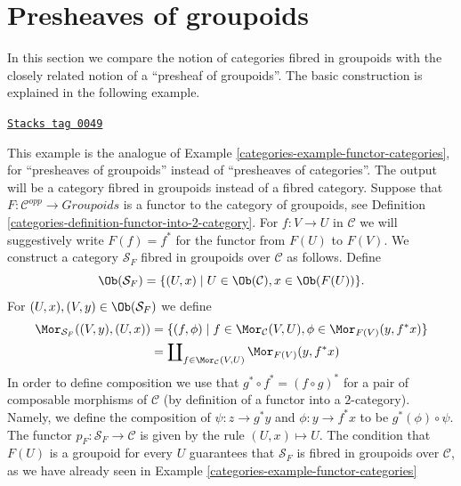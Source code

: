 \section{Presheaves of groupoids}
\label{categories-section-presheaves-groupoids}
In this section we compare the notion of categories fibred in groupoids
with the closely related notion of a ``presheaf of groupoids''. The basic
construction is explained in the following example.

\begin{example}
\label{categories-example-functor-groupoids}
\href{https://stacks.math.columbia.edu/tag/0049}{\texttt{Stacks tag 0049}}

This example is the analogue of
Example \ref{categories-example-functor-categories},
for ``presheaves of groupoids'' instead of ``presheaves of categories''.
The output will be a category fibred in groupoids instead of a fibred category.
Suppose that $F : \mathcal{C}^{opp} \to \textit{Groupoids}$ is a functor
to the category of groupoids, see
Definition \ref{categories-definition-functor-into-2-category}.
For $f : V \to U$ in $\mathcal{C}$ we will
suggestively write $F(f) = f^\ast$ for the functor from $F(U)$ to $F(V)$.
We construct a category $\mathcal{S}_F$ fibred in groupoids over $\mathcal{C}$
as follows. Define
$$
\Ob(\mathcal{S}_F) =
\{(U, x) \mid U\in \Ob(\mathcal{C}), x\in \Ob(F(U))\}.
$$
For $(U, x), (V, y) \in \Ob(\mathcal{S}_F)$ we define
\begin{align*}
\Mor_{\mathcal{S}_F}((V, y), (U, x))
& =
\{ (f, \phi) \mid f \in \Mor_\mathcal{C}(V, U),
\phi \in \Mor_{F(V)}(y, f^\ast x)\} \\
& =
\coprod\nolimits_{f \in \Mor_\mathcal{C}(V, U)}
\Mor_{F(V)}(y, f^\ast x)
\end{align*}
In order to define composition we use that $g^\ast \circ f^\ast =
(f \circ g)^\ast$ for a pair of composable morphisms of $\mathcal{C}$
(by definition of a functor into a $2$-category).
Namely, we define the composition of $\psi : z \to g^\ast y$ and
$ \phi : y \to f^\ast x$ to be $ g^\ast(\phi) \circ \psi$. The functor
$p_F : \mathcal{S}_F \to \mathcal{C}$ is given by the rule $(U, x) \mapsto U$.
The condition that $F(U)$ is a groupoid for every $U$ guarantees that
$\mathcal{S}_F$ is fibred in groupoids over $\mathcal{C}$, as we have
already seen in
Example \ref{categories-example-functor-categories}

\end{example}
